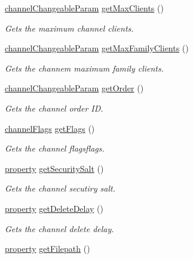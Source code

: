 \begin{DoxyCompactItemize}
\hyperlink{struct_ts3_api_1_1_channel_1_1channel_changeable_param}{channel\+Changeable\+Param} \hyperlink{class_ts3_api_1_1_channel_af1c732fc3662583b5f1a27df09c31225}{get\+Max\+Clients} ()
\begin{DoxyCompactList}\small\item\em Gets the maximum channel clients. \end{DoxyCompactList}\item 
\hyperlink{struct_ts3_api_1_1_channel_1_1channel_changeable_param}{channel\+Changeable\+Param} \hyperlink{class_ts3_api_1_1_channel_a4b77cc2a599ca9c8f535fdd22a9826f9}{get\+Max\+Family\+Clients} ()
\begin{DoxyCompactList}\small\item\em Gets the channem maximum family clients. \end{DoxyCompactList}\item 
\hyperlink{struct_ts3_api_1_1_channel_1_1channel_changeable_param}{channel\+Changeable\+Param} \hyperlink{class_ts3_api_1_1_channel_a4eef83062ec9df4f2e66cb399ee9a916}{get\+Order} ()
\begin{DoxyCompactList}\small\item\em Gets the channel order ID. \end{DoxyCompactList}\item 
\hyperlink{struct_ts3_api_1_1_channel_1_1channel_flags}{channel\+Flags} \hyperlink{class_ts3_api_1_1_channel_ae2d7acea0b808965a7ce9001e1b13dcb}{get\+Flags} ()
\begin{DoxyCompactList}\small\item\em Gets the channel flagsflags. \end{DoxyCompactList}\item 
\hyperlink{struct_ts3_api_1_1property}{property} \hyperlink{class_ts3_api_1_1_channel_a971cf9d6ed8759120ed68319922fc028}{get\+Security\+Salt} ()
\begin{DoxyCompactList}\small\item\em Gets the channel secutiry salt. \end{DoxyCompactList}\item 
\hyperlink{struct_ts3_api_1_1property}{property} \hyperlink{class_ts3_api_1_1_channel_a760b3a902325a34d9e82ff49946535a9}{get\+Delete\+Delay} ()
\begin{DoxyCompactList}\small\item\em Gets the channel delete delay. \end{DoxyCompactList}\item 
\hyperlink{struct_ts3_api_1_1property}{property} \hyperlink{class_ts3_api_1_1_channel_a2e9efe39dddfa4ef8e39774269525bce}{get\+Filepath} ()

\end{DoxyCompactItemize}
